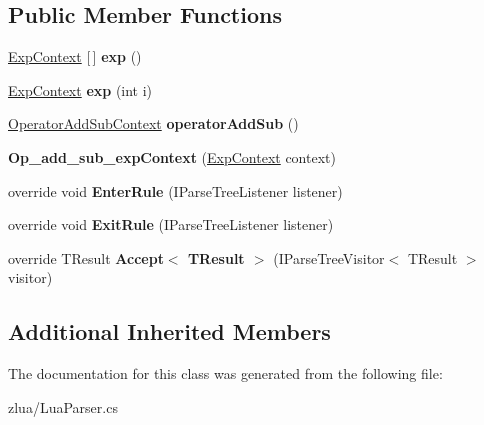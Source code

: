 \subsection*{Public Member Functions}
\begin{DoxyCompactItemize}
\item 
\mbox{\label{classzlua_1_1_lua_parser_1_1_op__add__sub__exp_context_acc6a36ceb192ca5e2ceca946c3c322e4}} 
\mbox{\hyperlink{classzlua_1_1_lua_parser_1_1_exp_context}{Exp\+Context}} \mbox{[}$\,$\mbox{]} {\bfseries exp} ()
\item 
\mbox{\label{classzlua_1_1_lua_parser_1_1_op__add__sub__exp_context_a78c03741019256e356c274351582fa9f}} 
\mbox{\hyperlink{classzlua_1_1_lua_parser_1_1_exp_context}{Exp\+Context}} {\bfseries exp} (int i)
\item 
\mbox{\label{classzlua_1_1_lua_parser_1_1_op__add__sub__exp_context_a536634b8446c19bd3efb12ef4645fe12}} 
\mbox{\hyperlink{classzlua_1_1_lua_parser_1_1_operator_add_sub_context}{Operator\+Add\+Sub\+Context}} {\bfseries operator\+Add\+Sub} ()
\item 
\mbox{\label{classzlua_1_1_lua_parser_1_1_op__add__sub__exp_context_a71f796b11b3265374612c02160f1652c}} 
{\bfseries Op\+\_\+add\+\_\+sub\+\_\+exp\+Context} (\mbox{\hyperlink{classzlua_1_1_lua_parser_1_1_exp_context}{Exp\+Context}} context)
\item 
\mbox{\label{classzlua_1_1_lua_parser_1_1_op__add__sub__exp_context_ae6993caff00e8211213b7a4922c68e6c}} 
override void {\bfseries Enter\+Rule} (I\+Parse\+Tree\+Listener listener)
\item 
\mbox{\label{classzlua_1_1_lua_parser_1_1_op__add__sub__exp_context_afd2084e564620f98592481357a182262}} 
override void {\bfseries Exit\+Rule} (I\+Parse\+Tree\+Listener listener)
\item 
\mbox{\label{classzlua_1_1_lua_parser_1_1_op__add__sub__exp_context_a09aad93db6ce44ec20210d1bdb773ee2}} 
override T\+Result {\bfseries Accept$<$ T\+Result $>$} (I\+Parse\+Tree\+Visitor$<$ T\+Result $>$ visitor)
\end{DoxyCompactItemize}
\subsection*{Additional Inherited Members}


The documentation for this class was generated from the following file\+:\begin{DoxyCompactItemize}
\item 
zlua/Lua\+Parser.\+cs\end{DoxyCompactItemize}
